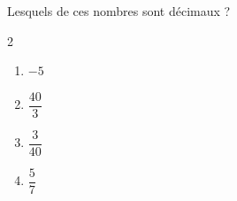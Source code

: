 \begin{exo}{}
	Lesquels de ces nombres sont décimaux ?
	\vspace*{-2mm}
	\begin{multicols}{2}
	\begin{enumerate}
		\item $-5$
		\item $\dfrac{40}{3}$
		\item $\dfrac{3}{40}$
		\item $\dfrac{5}{7}$
	\end{enumerate}
	\end{multicols}\vspace*{-2mm}
\end{exo}
